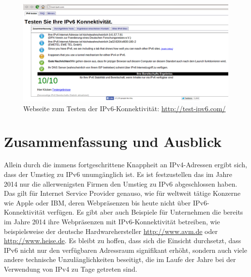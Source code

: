\documentclass[a4paper,12pt]{scrartcl}
\begin{document}
\begin{figure}[htb]
\begin{center}
 \includegraphics[width=1\hsize]{./images/testipv6.png}
 \end{center}
\caption[Webseite zum Testen der IPv6-Konnektivit\"at: \url{http://test-ipv6.com/}]{\label{testipv6}Webseite zum Testen der IPv6-Konnektivit\"at: \url{http://test-ipv6.com/}}
\end{figure}

\section{Zusammenfassung und Ausblick}
\label{sec:5}
Allein durch die immens fortgeschrittene Knappheit an IPv4-Adressen ergibt sich, dass der Umstieg zu IPv6 unumg\"anglich ist. Es ist festzustellen das im Jahre 2014 nur die allerwenigsten Firmen den Umstieg zu IPv6 abgeschlossen haben. Das gilt f\"ur Internet Service Provider genauso, wie f\"ur weltweit tätige Konzerne wie Apple oder IBM, deren Webpräsenzen bis heute nicht über IPv6-Konnektivit\"at verf\"ugen. Es gibt aber auch Beispiele für Unternehmen die bereits im Jahre 2014 ihre Webpräsenzen mit IPv6-Konnektivität betreiben, wie beispielsweise der deutsche Hardwarehersteller \url{http://www.avm.de} oder \url{http://www.heise.de}. Es bleibt zu hoffen, dass sich die Einsicht durchsetzt, dass IPv6 nicht nur den verf\"ugbaren Adressraum signifikant erh\"oht, sondern auch viele andere technische Unzul\"anglichkeiten beseitigt, die im Laufe der Jahre bei der Verwendung von IPv4 zu Tage getreten sind.

\clearpage
\end{document}
